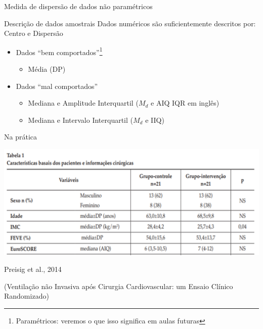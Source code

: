 \documentclass{beamer}
\begin{document}
\begin{frame}{\scriptsize Medida de dispersão de dados não paramétricos}
  \begin{block}{Descrição de dados amostrais}
    \scriptsize
    Dados numéricos são suficientemente descritos por: Centro e Dispersão

    \bigskip
    \begin{itemize}
      \footnotesize
    \item Dados ``bem comportados''\footnote{\tiny Paramétricos: veremos o que isso significa em aulas futuras}
      \begin{itemize}
        \scriptsize
      \item Média (DP)
      \end{itemize}
      \bigskip
    \item Dados ``mal comportados''
      \begin{itemize}
        \scriptsize
      \item Mediana e Amplitude Interquartil ($M_d$ e AIQ {\tiny IQR em inglês})
      \item Mediana e Intervalo Interquartil ($M_d$ e IIQ)
      \end{itemize}
    \end{itemize}
  \end{block}
\end{frame}

\begin{frame}{\scriptsize Na prática}
  \begin{center}
    \includegraphics[width=\textwidth]{Cap3/exemplo-desc}
  \end{center}

  \vfill
  \hfill \scriptsize Preisig et al., 2014

  \hfill \tiny (Ventilação não Invasiva após Cirurgia Cardiovascular: um Ensaio Clínico Randomizado)
\end{frame}
\end{document}
